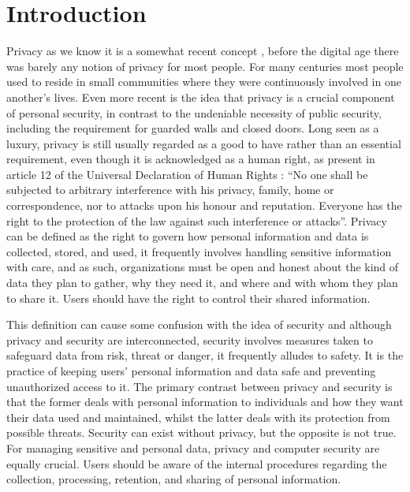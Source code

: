 %
%
\section{Introduction} \label{introduction}

Privacy as we know it is a somewhat recent concept \cite{vincent2016privacy, moore2017privacy},
before the digital age there was barely any notion of privacy for most
people. For many centuries most people used to reside in small communities
where they were continuously involved in one another's lives. Even more
recent is the idea that privacy is a crucial component of personal security,
in contrast to the undeniable necessity of public security, including the
requirement for guarded walls and closed doors. Long seen as a luxury, privacy
is still usually regarded as a good to have rather than an essential
requirement, even though it is acknowledged as a human right, as present
in article 12 of the Universal Declaration of Human Rights \cite{RooseveltUniversal}:
``No one shall be subjected to arbitrary interference with his privacy,
family, home or correspondence, nor to attacks upon his honour and reputation.
Everyone has the right to the protection of the law against such interference
or attacks''. Privacy can be defined \cite{InternationalWhat, SpiekermannEngineering}
as the right to govern how personal information and data is collected, stored,
and used, it frequently involves handling sensitive information with care,
and as such, organizations must be open and honest about the kind of data
they plan to gather, why they need it, and where and with whom they plan
to share it. Users should have the right to control their shared information.

This definition can cause some confusion with the idea of security \cite{HIVDifference}
and although privacy and security are interconnected, security involves
measures taken to safeguard data from risk, threat or danger, it frequently
alludes to safety. It is the practice of keeping users' personal information
and data safe and preventing unauthorized access to it. The primary contrast
between privacy and security is that the former deals with personal information
to individuals and how they want their data used and maintained, whilst
the latter deals with its protection from possible threats. Security can
exist without privacy, but the opposite is not true. For managing sensitive
and personal data, privacy and computer security are equally crucial. Users
should be aware of the internal procedures regarding the collection, processing,
retention, and sharing of personal information.

